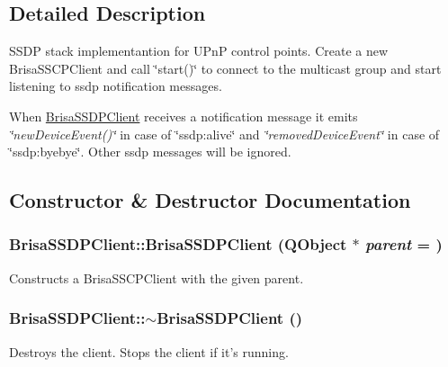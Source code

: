 \subsection{Detailed Description}
SSDP stack implementantion for UPnP control points. Create a new BrisaSSCPClient and call \char`\"{}start()\char`\"{} to connect to the multicast group and start listening to ssdp notification messages.

When \hyperlink{classBrisaUpnp_1_1BrisaSSDPClient}{BrisaSSDPClient} receives a notification message it emits {\itshape \char`\"{}newDeviceEvent()\char`\"{}\/} in case of \char`\"{}ssdp:alive\char`\"{} and {\itshape \char`\"{}removedDeviceEvent\char`\"{}\/} in case of \char`\"{}ssdp:byebye\char`\"{}. Other ssdp messages will be ignored. 

\subsection{Constructor \& Destructor Documentation}
\hypertarget{classBrisaUpnp_1_1BrisaSSDPClient_ae4f2ffbb21c38ea917730898c976b45d}{
\subsubsection[{BrisaSSDPClient}]{\setlength{\rightskip}{0pt plus 5cm}BrisaSSDPClient::BrisaSSDPClient (QObject $\ast$ {\em parent} = {})}}
\label{classBrisaUpnp_1_1BrisaSSDPClient_ae4f2ffbb21c38ea917730898c976b45d}


Constructs a BrisaSSCPClient with the given parent. \hypertarget{classBrisaUpnp_1_1BrisaSSDPClient_a36f414fee62097836c79895460e330bc}{
\subsubsection[{$\sim$BrisaSSDPClient}]{\setlength{\rightskip}{0pt plus 5cm}BrisaSSDPClient::$\sim$BrisaSSDPClient ()}}
\label{classBrisaUpnp_1_1BrisaSSDPClient_a36f414fee62097836c79895460e330bc}


Destroys the client. Stops the client if it's running. 

